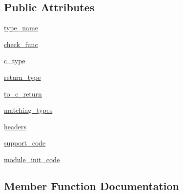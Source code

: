 \subsection*{Public Attributes}
\begin{DoxyCompactItemize}
\item 
\hyperlink{classscipy_1_1weave_1_1standard__array__spec_1_1array__converter_ac2f04195767ca6aa372ba7514c824ea7}{type\+\_\+name}
\item 
\hyperlink{classscipy_1_1weave_1_1standard__array__spec_1_1array__converter_a38778278f0734b0921a0f1f010b3e42e}{check\+\_\+func}
\item 
\hyperlink{classscipy_1_1weave_1_1standard__array__spec_1_1array__converter_af7f08efec6c7d2394a2dd8aba7474598}{c\+\_\+type}
\item 
\hyperlink{classscipy_1_1weave_1_1standard__array__spec_1_1array__converter_ad66b254c9a003a7c4606ab0ea12b0fc7}{return\+\_\+type}
\item 
\hyperlink{classscipy_1_1weave_1_1standard__array__spec_1_1array__converter_a87ef6cd1f32de9ea3e4bdab765cd76dc}{to\+\_\+c\+\_\+return}
\item 
\hyperlink{classscipy_1_1weave_1_1standard__array__spec_1_1array__converter_a06f18d73bd38a9e4e289e0caf1053d75}{matching\+\_\+types}
\item 
\hyperlink{classscipy_1_1weave_1_1standard__array__spec_1_1array__converter_a8c914f090247300b4c4a993b011b27cc}{headers}
\item 
\hyperlink{classscipy_1_1weave_1_1standard__array__spec_1_1array__converter_ac9b022698cf9804cd22490f257f2bc8b}{support\+\_\+code}
\item 
\hyperlink{classscipy_1_1weave_1_1standard__array__spec_1_1array__converter_a196b46cbc7f9fccbe14aef8f5f05ced4}{module\+\_\+init\+\_\+code}
\end{DoxyCompactItemize}


\subsection{Member Function Documentation}
\hypertarget{classscipy_1_1weave_1_1standard__array__spec_1_1array__converter_a0b5e5212a62fbde56d11aa88de521ca6}{}
